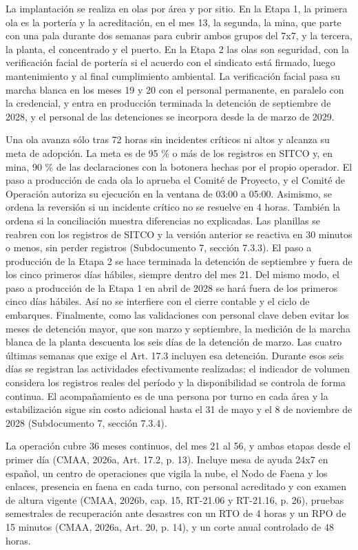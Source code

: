 \documentclass[subdoc]{../../comun/overfore}
\begin{document}
La implantación se realiza en olas por área y por sitio. En la Etapa 1, la primera ola es la portería y la acreditación, en el mes 13, la segunda, la mina, que parte con una pala durante dos semanas para cubrir ambos grupos del 7x7, y la tercera, la planta, el concentrado y el puerto. En la Etapa 2 las olas son seguridad, con la verificación facial de portería si el acuerdo con el sindicato está firmado, luego mantenimiento y al final cumplimiento ambiental. La verificación facial pasa su marcha blanca en los meses 19 y 20 con el personal permanente, en paralelo con la credencial, y entra en producción terminada la detención de septiembre de 2028, y el personal de las detenciones se incorpora desde la de marzo de 2029.

Una ola avanza sólo tras 72 horas sin incidentes críticos ni altos y alcanza su meta de adopción. La meta es de 95 \% o más de los registros en SITCO y, en mina, 90 \% de las declaraciones con la botonera hechas por el propio operador. El paso a producción de cada ola lo aprueba el Comité de Proyecto, y el Comité de Operación autoriza su ejecución en la ventana de 03:00 a 05:00. Asimismo, se ordena la reversión si un incidente crítico no se resuelve en 4 horas. También la ordena si la conciliación muestra diferencias no explicadas. Las planillas se reabren con los registros de SITCO y la versión anterior se reactiva en 30 minutos o menos, sin perder registros (Subdocumento 7, sección 7.3.3). El paso a producción de la Etapa 2 se hace terminada la detención de septiembre y fuera de los cinco primeros días hábiles, siempre dentro del mes 21. Del mismo modo, el paso a producción de la Etapa 1 en abril de 2028 se hará fuera de los primeros cinco días hábiles. Así no se interfiere con el cierre contable y el ciclo de embarques. Finalmente, como las validaciones con personal clave deben evitar los meses de detención mayor, que son marzo y septiembre, la medición de la marcha blanca de la planta descuenta los seis días de la detención de marzo. Las cuatro últimas semanas que exige el Art. 17.3 incluyen esa detención. Durante esos seis días se registran las actividades efectivamente realizadas; el indicador de volumen considera los registros reales del período y la disponibilidad se controla de forma continua. El acompañamiento es de una persona por turno en cada área y la estabilización sigue sin costo adicional hasta el 31 de mayo y el 8 de noviembre de 2028 (Subdocumento 7, sección 7.3.4).

La operación cubre 36 meses continuos, del mes 21 al 56, y ambas etapas desde el primer día (CMAA, 2026a, Art. 17.2, p. 13). Incluye mesa de ayuda 24x7 en español, un centro de operaciones que vigila la nube, el Nodo de Faena y los enlaces, presencia en faena en cada turno, con personal acreditado y con examen de altura vigente (CMAA, 2026b, cap. 15, RT-21.06 y RT-21.16, p. 26), pruebas semestrales de recuperación ante desastres con un RTO de 4 horas y un RPO de 15 minutos (CMAA, 2026a, Art. 20, p. 14), y un corte anual controlado de 48 horas.
\end{document}
